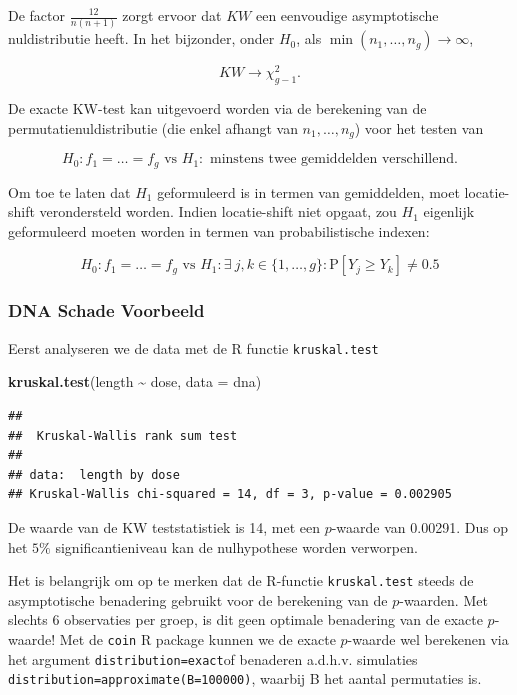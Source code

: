 \documentclass[
  12pt,dutch]{book}
\newenvironment{Shaded}{\begin{snugshade}}{\end{snugshade}}
\newcommand{\AttributeTok}[1]{\textcolor[rgb]{0.13,0.29,0.53}{#1}}
\newcommand{\FunctionTok}[1]{\textcolor[rgb]{0.13,0.29,0.53}{\textbf{#1}}}
\newcommand{\NormalTok}[1]{#1}
\newcommand{\SpecialCharTok}[1]{\textcolor[rgb]{0.81,0.36,0.00}{\textbf{#1}}}
\theoremstyle{definition}
\theoremstyle{definition}
\theoremstyle{definition}
\theoremstyle{definition}
\theoremstyle{remark}
\begin{document}
De factor \(\frac{12}{n(n+1)}\) zorgt ervoor dat \(KW\) een eenvoudige asymptotische nuldistributie heeft. In het bijzonder, onder \(H_0\), als \(\min(n_1,\ldots, n_g)\rightarrow \infty\),

\[
    KW  \rightarrow \chi^2_{g-1}.
  \]

De exacte KW-test kan uitgevoerd worden via de berekening van de permutatienuldistributie (die enkel afhangt van \(n_1, \ldots, n_g\)) voor het testen van

\[H_0: f_1=\ldots=f_g \text{ vs } H_1: \text{ minstens twee gemiddelden verschillend}.\]

Om toe te laten dat \(H_1\) geformuleerd is in termen van gemiddelden, moet locatie-shift verondersteld worden. Indien locatie-shift niet opgaat, zou \(H_1\) eigenlijk geformuleerd moeten worden in termen van probabilistische indexen:

\[H_0: f_1=\ldots=f_g \text{ vs } H_1: \exists\ j,k \in \{1,\ldots,g\} : \text{P}\left[Y_j\geq Y_k\right]\neq 0.5\]

\subsubsection{DNA Schade Voorbeeld}\label{dna-schade-voorbeeld}

Eerst analyseren we de data met de R functie \texttt{kruskal.test}

\begin{Shaded}
\begin{Highlighting}[]
\FunctionTok{kruskal.test}\NormalTok{(length }\SpecialCharTok{\textasciitilde{}}\NormalTok{ dose, }\AttributeTok{data =}\NormalTok{ dna)}
\end{Highlighting}
\end{Shaded}

\begin{verbatim}
## 
##  Kruskal-Wallis rank sum test
## 
## data:  length by dose
## Kruskal-Wallis chi-squared = 14, df = 3, p-value = 0.002905
\end{verbatim}

De waarde van de KW teststatistiek is 14, met een \(p\)-waarde van 0.00291. Dus op het \(5\%\) significantieniveau kan de nulhypothese worden verworpen.

Het is belangrijk om op te merken dat de R-functie \texttt{kruskal.test} steeds de asymptotische benadering gebruikt voor de berekening van de \(p\)-waarden. Met slechts 6 observaties per groep, is dit geen optimale benadering van de exacte \(p\)-waarde!
Met de \texttt{coin} R package kunnen we de exacte \(p\)-waarde wel berekenen via het argument \texttt{distribution=\textquotesingle{}exact\textquotesingle{}}of benaderen a.d.h.v. simulaties \texttt{distribution=approximate(B=100000)}, waarbij B het aantal permutaties is.
\end{document}
